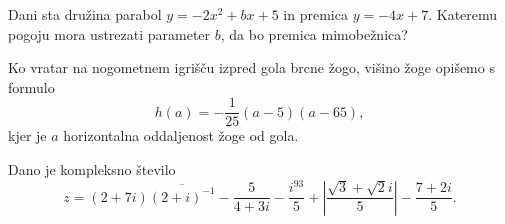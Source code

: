 \documentclass[addpoints]{exam}
\begin{document}
\begin{questions}

    \question[5]
        Dani sta družina parabol $y=-2x^2+bx+5$ in premica $y=-4x+7$.
        Kateremu pogoju mora ustrezati parameter $b$, da bo premica mimobežnica?

            \begin{solution}[8cm]

            \end{solution}


    \question
        Ko vratar na nogometnem igrišču izpred gola brcne žogo, višino žoge opišemo s formulo
        $$ h(a)=-\frac{1}{25}\left(a-5\right)\left(a-65\right), $$
        kjer je $a$ horizontalna oddaljenost žoge od gola.
        

            \begin{solution}[3cm]

            \end{solution}


    \question
        Dano je kompleksno število $$z= \left(2+7i\right)\overline{\left(2+i\right)^{-1}}-\dfrac{5}{4+3i}-\dfrac{i^{93}}{5}+\left|\dfrac{\sqrt{3}+\sqrt{2}i}{5}\right|-\dfrac{7+2i}{5}. $$

\end{questions}
\end{document}
